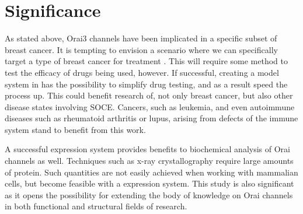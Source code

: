 \section{Significance}
As stated above, Orai3 \Ca{} channels have been implicated in a specific subset of breast cancer. It is tempting to envision a scenario where we can specifically  target a type of breast cancer for treatment \citep{Dellis2011}. This will require some method to test the efficacy of drugs being used, however. If successful, creating a model system in \droso{} has the possibility to simplify drug testing, and as a result speed the process up. This could benefit research of, not only breast cancer, but also other disease states involving SOCE. Cancers, such as leukemia, and even autoimmune diseases such as rheumatoid arthritis or lupus, arising from defects of the immune system stand to benefit from this work. 

A successful \droso{} expression system provides benefits to biochemical analysis of Orai channels as well. Techniques such as x-ray crystallography require large amounts of protein. Such quantities are not easily achieved when working with mammalian cells, but become feasible with a \droso{} expression system. This study is also significant as it opens the possibility for extending the body of knowledge on Orai channels in both functional and structural fields of research.

